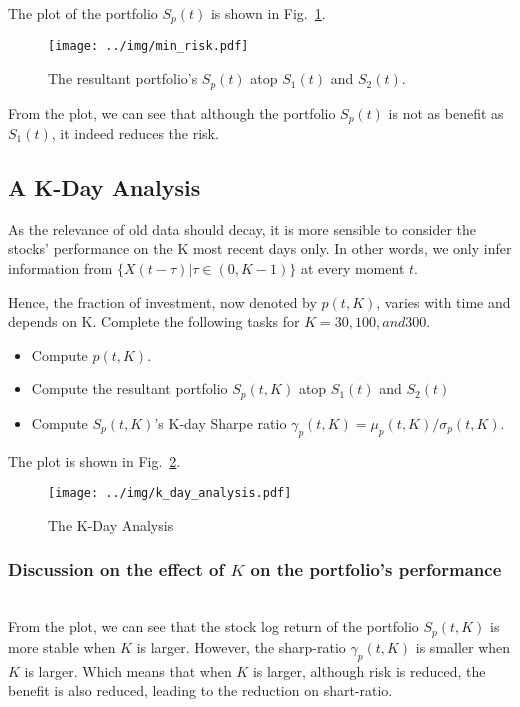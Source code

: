 \documentclass[runningheads]{llncs}
\begin{document}
The plot of the portfolio $S_p(t)$ is shown in Fig.~\ref{fig:portfolio}.

\begin{figure}
    \centering
    \texttt{[image: ../img/min\_risk.pdf]}
    \caption{The resultant portfolio's $S_p(t)$ atop $S_1(t)$ and $S_2(t)$.}
    \label{fig:portfolio}
\end{figure}

From the plot, we can see that although the portfolio $S_p(t)$ is not as benefit as $S_1(t)$, it indeed reduces the risk.

\subsection{A K-Day Analysis}
As the relevance of old data should decay, it is more sensible to consider the
stocks' performance on the K most recent days only. In other words, we only
infer information from $\{X(t-\tau)|\tau\in(0,K-1)\}$ at every moment $t$.

Hence, the fraction of investment, now denoted by $p(t, K)$, varies with time
and depends on K. Complete the following tasks for $K = 30, 100, and 300$.

\begin{itemize}
    \item Compute $p(t, K)$.
    \item Compute the resultant portfolio $S_p(t,K)$ atop $S_1(t)$ and $S_2(t)$
    \item Compute $S_p(t,K)$'s K-day Sharpe ratio $\gamma_p(t,K)=\mu_p(t,K)/\sigma_p(t,K)$.
\end{itemize}

The plot is shown in Fig.~\ref{fig:portfolio_k}.

\begin{figure}
    \centering
    \texttt{[image: ../img/k\_day\_analysis.pdf]}
    \caption{The K-Day Analysis}
    \label{fig:portfolio_k}
\end{figure}

\subsubsection*{Discussion on the effect of $K$ on the portfolio's performance}
\hfill\\
From the plot, we can see that the stock log return of the portfolio $S_p(t,K)$ is more stable when $K$ is larger.
However, the sharp-ratio $\gamma_p(t,K)$ is smaller when $K$ is larger.
Which means that when $K$ is larger, although risk is reduced, the benefit is also reduced, leading to the reduction on shart-ratio.
\end{document}
